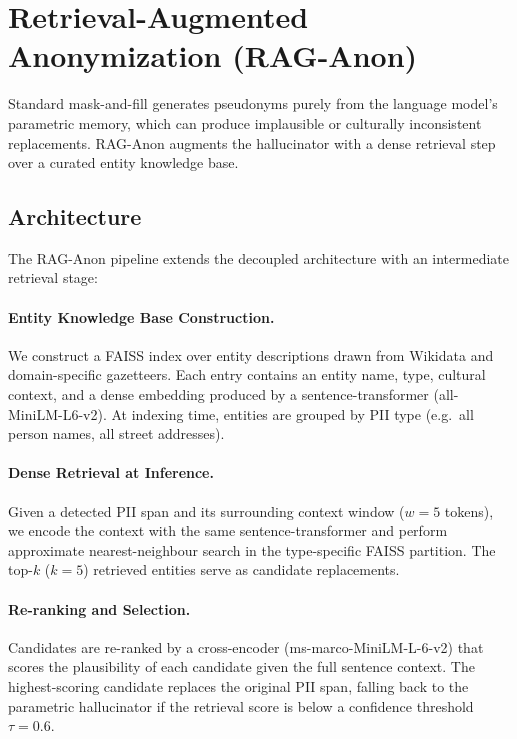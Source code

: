 \documentclass[11pt, a4paper]{article}
\begin{document}

\section{Retrieval-Augmented Anonymization (RAG-Anon)}
\label{sec:rag_anon}

Standard mask-and-fill generates pseudonyms purely from the language model's parametric memory, which can produce implausible or culturally inconsistent replacements.  RAG-Anon augments the hallucinator with a dense retrieval step over a curated entity knowledge base.

\subsection{Architecture}

The RAG-Anon pipeline extends the decoupled architecture with an intermediate retrieval stage:

\paragraph{Entity Knowledge Base Construction.}
We construct a FAISS index over entity descriptions drawn from Wikidata and domain-specific gazetteers.  Each entry contains an entity name, type, cultural context, and a dense embedding produced by a sentence-transformer (all-MiniLM-L6-v2).  At indexing time, entities are grouped by PII type (e.g.\ all person names, all street addresses).

\paragraph{Dense Retrieval at Inference.}
Given a detected PII span and its surrounding context window ($w{=}5$ tokens), we encode the context with the same sentence-transformer and perform approximate nearest-neighbour search in the type-specific FAISS partition.  The top-$k$ ($k{=}5$) retrieved entities serve as candidate replacements.

\paragraph{Re-ranking and Selection.}
Candidates are re-ranked by a cross-encoder (ms-marco-MiniLM-L-6-v2) that scores the plausibility of each candidate given the full sentence context.  The highest-scoring candidate replaces the original PII span, falling back to the parametric hallucinator if the retrieval score is below a confidence threshold $\tau{=}0.6$.
\end{document}
